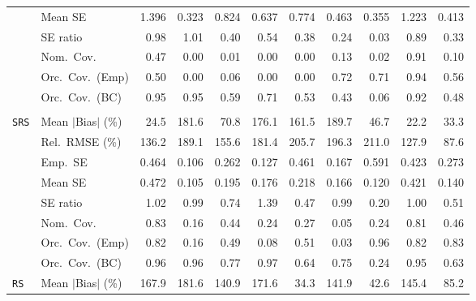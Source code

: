 \begin{landscape}
\begin{longtable}{llrrrrrrrrr}
 & Mean SE & 1.396 & 0.323 & 0.824 & 0.637 & 0.774 & 0.463 & 0.355 & 1.223 & 0.413 \\
 & SE ratio & \cellcolor{ranktwo}0.98 & \cellcolor{rankone}1.01 & 0.40 & 0.54 & 0.38 & 0.24 & 0.03 & \cellcolor{rankthree}0.89 & 0.33 \\
 & Nom.\ Cov. & \cellcolor{ranktwo}0.47 & 0.00 & 0.01 & 0.00 & 0.00 & \cellcolor{rankthree}0.13 & 0.02 & \cellcolor{rankone}0.91 & 0.10 \\
 & Orc.\ Cov.\ (Emp) & 0.50 & 0.00 & 0.06 & 0.00 & 0.00 & \cellcolor{ranktwo}0.72 & \cellcolor{rankthree}0.71 & \cellcolor{rankone}0.94 & 0.56 \\
 & Orc.\ Cov.\ (BC) & \cellcolor{rankone}0.95 & \cellcolor{rankone}0.95 & 0.59 & \cellcolor{rankthree}0.71 & 0.53 & 0.43 & 0.06 & \cellcolor{ranktwo}0.92 & 0.48 \\
\addlinespace[2pt]
\multicolumn{11}{l}{\textbf{Continuous Phase-One Covariates}} \\
\addlinespace[2pt]
\quad \texttt{SRS} & Mean $|$Bias$|$ (\%) & \cellcolor{ranktwo}24.5 & 181.6 & 70.8 & 176.1 & 161.5 & 189.7 & 46.7 & \cellcolor{rankone}22.2 & \cellcolor{rankthree}33.3 \\
 & Rel.\ RMSE (\%) & \cellcolor{rankthree}136.2 & 189.1 & 155.6 & 181.4 & 205.7 & 196.3 & 211.0 & \cellcolor{ranktwo}127.9 & \cellcolor{rankone}87.6 \\
 & Emp.\ SE & 0.464 & 0.106 & 0.262 & 0.127 & 0.461 & 0.167 & 0.591 & 0.423 & 0.273 \\
 & Mean SE & 0.472 & 0.105 & 0.195 & 0.176 & 0.218 & 0.166 & 0.120 & 0.421 & 0.140 \\
 & SE ratio & \cellcolor{rankthree}1.02 & \cellcolor{ranktwo}0.99 & 0.74 & 1.39 & 0.47 & \cellcolor{ranktwo}0.99 & 0.20 & \cellcolor{rankone}1.00 & 0.51 \\
 & Nom.\ Cov. & \cellcolor{rankone}0.83 & 0.16 & 0.44 & 0.24 & 0.27 & 0.05 & 0.24 & \cellcolor{ranktwo}0.81 & \cellcolor{rankthree}0.46 \\
 & Orc.\ Cov.\ (Emp) & \cellcolor{rankthree}0.82 & 0.16 & 0.49 & 0.08 & 0.51 & 0.03 & \cellcolor{rankone}0.96 & \cellcolor{rankthree}0.82 & \cellcolor{ranktwo}0.83 \\
 & Orc.\ Cov.\ (BC) & \cellcolor{ranktwo}0.96 & \cellcolor{ranktwo}0.96 & 0.77 & \cellcolor{rankthree}0.97 & 0.64 & 0.75 & 0.24 & \cellcolor{rankone}0.95 & 0.63 \\
\addlinespace[2pt]
\quad \texttt{RS} & Mean $|$Bias$|$ (\%) & 167.9 & 181.6 & 140.9 & 171.6 & \cellcolor{rankone}34.3 & 141.9 & \cellcolor{ranktwo}42.6 & 145.4 & \cellcolor{rankthree}85.2 \\

\end{longtable}
\end{landscape}
